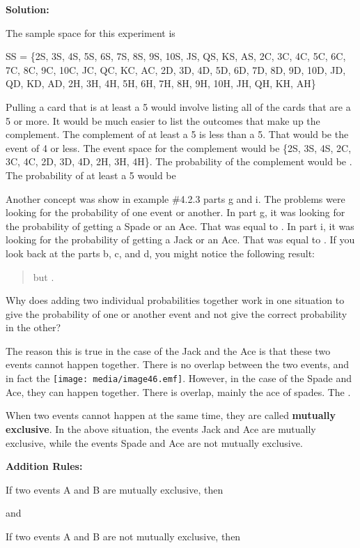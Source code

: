 \documentclass[]{book}
\begin{document}
\textbf{Solution:}

The sample space for this experiment is

SS = \{2S, 3S, 4S, 5S, 6S, 7S, 8S, 9S, 10S, JS, QS, KS, AS, 2C, 3C,
4C, 5C, 6C, 7C, 8C, 9C, 10C, JC, QC, KC, AC, 2D, 3D, 4D, 5D, 6D, 7D,
8D, 9D, 10D, JD, QD, KD, AD, 2H, 3H, 4H, 5H, 6H, 7H, 8H, 9H, 10H,
JH, QH, KH, AH\}

Pulling a card that is at least a 5 would involve listing all of the
cards that are a 5 or more. It would be much easier to list the
outcomes that make up the complement. The complement of at least a 5
is less than a 5. That would be the event of 4 or less. The event
space for the complement would be \{2S, 3S, 4S, 2C, 3C, 4C, 2D, 3D,
4D, 2H, 3H, 4H\}. The probability of the complement would be . The
probability of at least a 5 would be

Another concept was show in example \#4.2.3 parts g and i. The problems
were looking for the probability of one event or another. In part g, it
was looking for the probability of getting a Spade or an Ace. That was
equal to . In part i, it was looking for the probability of getting a
Jack or an Ace. That was equal to . If you look back at the parts b, c,
and d, you might notice the following result:

\begin{quote}
but .
\end{quote}

Why does adding two individual probabilities together work in one
situation to give the probability of one or another event and not give
the correct probability in the other?

The reason this is true in the case of the Jack and the Ace is that
these two events cannot happen together. There is no overlap between the
two events, and in fact the \texttt{[image: media/image46.emf]}. However, in the case
of the Spade and Ace, they can happen together. There is overlap, mainly
the ace of spades. The .

When two events cannot happen at the same time, they are called
\textbf{mutually exclusive}. In the above situation, the events Jack and Ace
are mutually exclusive, while the events Spade and Ace are not mutually
exclusive.

\textbf{Addition Rules:}

If two events A and B are mutually exclusive, then

and

If two events A and B are not mutually exclusive, then
\end{document}
